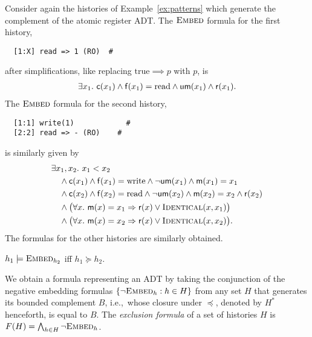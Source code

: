 \begin{example}
  \label{ex:formulas}

  Consider again the histories of Example~\ref{ex:patterns} which generate the
  complement of the atomic register ADT. The $\textsc{Embed}$ formula for the
  first history,
\begin{verbatim}
  [1:X] read => 1 (RO)  #
\end{verbatim}
  after simplifications, like replacing $\mathrm{true} \implies p$ with $p$, is
  \begin{align*}
    \exists x_1.\ {\sf c}(x_1) \land {\sf f}(x_1) = \mathrm{read} \land {\sf um}(x_1) \land {\sf r}(x_1).
  \end{align*}
  The $\textsc{Embed}$ formula for the second history,
\begin{verbatim}
  [1:1] write(1)            #
  [2:2] read => - (RO)    #
\end{verbatim}
  is similarly given by
  \begin{align*}
    & \exists x_1, x_2.\ x_1 < x_2 \\
    & \quad \land {\sf c}(x_1) \land {\sf f}(x_1) = \mathrm{write}
      \land \lnot{\sf um}(x_1) \land {\sf m}(x_1) = x_1 \\
    & \quad \land {\sf c}(x_2) \land {\sf f}(x_2) = \mathrm{read}
      \land \lnot{\sf um}(x_2) \land {\sf m}(x_2) = x_2\land {\sf r}(x_2) \\
    & \quad \land \big(\forall x.\ {\sf m}(x) = x_1 \implies {\sf r}(x) \lor \textsc{Identical}(x,x_1)\big) \\
    & \quad \land \big(\forall x.\ {\sf m}(x) = x_2 \implies {\sf r}(x) \lor \textsc{Identical}(x,x_2)\big).
  \end{align*}
  The formulas for the other histories are similarly obtained.

\end{example}

\begin{lemma}\label{lem:formula1}

  $h_1 \models \textsc{Embed}_{h_2}$ if{f} $h_1 \succeq h_2$.

\end{lemma}

We obtain a formula representing an ADT by taking the conjunction of the
negative embedding formulas $\set{ \lnot\textsc{Embed}_h : h \in H }$ from any
set $H$ that generates its bounded complement $B$, i.e.,~whose closure under
$\preceq$, denoted by $H^*$ henceforth, is equal to $B$. The
\emph{exclusion formula} of a set of histories $H$ is $F(H) = \bigwedge_{h \in
H} \neg \textsc{Embed}_h$.

